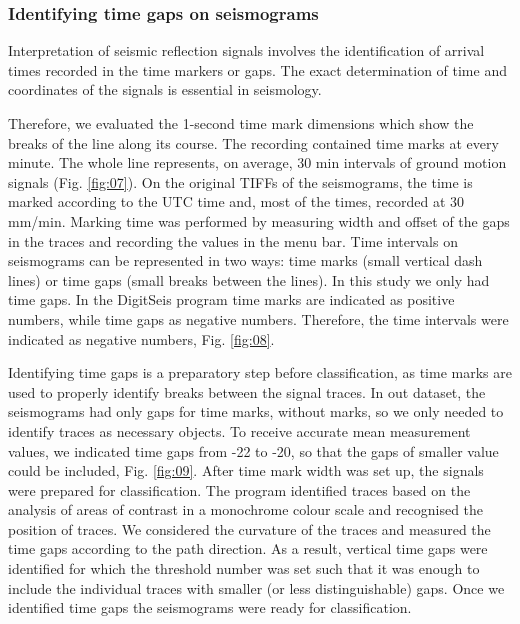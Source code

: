\documentclass[sensors,article,submit,moreauthors,pdftex]{Definitions/mdpi}
\begin{document}
\subsubsection{Identifying time gaps on seismograms}
Interpretation of seismic reflection signals involves the identification of arrival times recorded in the time markers or gaps. The exact determination of time and coordinates of the signals is essential in seismology. 

Therefore, we evaluated the 1-second time mark dimensions which show the breaks of the line along its course. The recording contained time marks at every minute. The whole line represents, on average, 30 min intervals of ground motion signals (Fig. \ref{fig:07}). On the original TIFFs of the seismograms, the time is marked according to the \ac{UTC} time and, most of the times, recorded at 30 mm/min. Marking time was performed by measuring width and offset of the gaps in the traces and recording the values in the menu bar. Time intervals on seismograms can be represented in two ways: time marks (small vertical dash lines) or time gaps (small breaks between the lines). In this study we only had time gaps. In the DigitSeis program time marks are indicated as positive numbers, while time gaps as negative numbers. Therefore, the time intervals were indicated as negative numbers, Fig. \ref{fig:08}. 

Identifying time gaps is a preparatory step before classification, as time marks are used to properly identify breaks between the signal traces. In out dataset, the seismograms had only gaps for time marks, without marks, so we only needed to identify traces as necessary objects. To receive accurate mean measurement values, we indicated time gaps from -22 to -20, so that the gaps of smaller value could be included, Fig. \ref{fig:09}. After time mark width was set up, the signals were prepared for classification. The program identified traces based on the analysis of areas of contrast in a monochrome colour scale and recognised the position of traces. We considered the curvature of the traces and measured the time gaps according to the path direction. As a result, vertical time gaps were identified for which the threshold number was set such that it was enough to include the individual traces with smaller (or less distinguishable) gaps. Once we identified time gaps the seismograms were ready for classification. 
\end{document}
